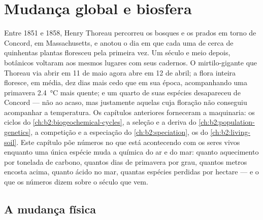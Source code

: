 \chapter{Mudança global e biosfera}\label{ch:b2:global-change}

Entre 1851 e 1858, Henry Thoreau percorreu os bosques e os prados em
torno de Concord, em Massachusetts, e anotou o dia em que cada uma de
cerca de quinhentas plantas floresceu pela primeira vez. Um século e meio
depois, botânicos voltaram aos mesmos lugares com seus cadernos. O
mirtilo-gigante que Thoreau via abrir em 11 de maio agora abre em
12 de abril; a flora inteira floresce, em média, dez dias mais cedo que
em sua época, acompanhando uma primavera \qty{2.4}{\celsius}
mais quente; e um quarto de suas espécies desapareceu de Concord --- não
ao acaso, mas justamente aquelas cuja floração não conseguiu acompanhar
a temperatura. Os capítulos anteriores forneceram a maquinaria: os ciclos
do \cref{ch:b2:biogeochemical-cycles}, a seleção e a deriva do
\cref{ch:b2:population-genetics}, a competição e a especiação
do \cref{ch:b2:speciation}, os  do \cref{ch:b2:living-soil}.
Este capítulo põe números no que está acontecendo com os seres vivos
enquanto uma única espécie muda a química do ar e do mar: quanto
aquecimento por tonelada de carbono, quantos dias de primavera por grau,
quantos metros encosta acima, quanto ácido no mar, quantas espécies
perdidas por hectare --- e o que os números dizem sobre o século que
vem.

\section{A mudança física}

